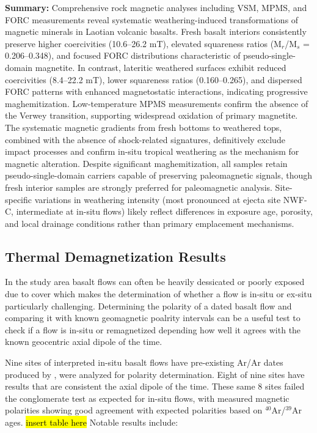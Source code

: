 \documentclass[twocolumn,11pt]{article}
\begin{document}
\textbf{Summary:} Comprehensive rock magnetic analyses including VSM, MPMS, and FORC measurements reveal systematic weathering-induced transformations of magnetic minerals in Laotian volcanic basalts. Fresh basalt interiors consistently preserve higher coercivities (10.6--26.2 mT), elevated squareness ratios (M$_r$/M$_s$ = 0.206--0.348), and focused FORC distributions characteristic of pseudo-single-domain magnetite. In contrast, lateritic weathered surfaces exhibit reduced coercivities (8.4--22.2 mT), lower squareness ratios (0.160--0.265), and dispersed FORC patterns with enhanced magnetostatic interactions, indicating progressive maghemitization. Low-temperature MPMS measurements confirm the absence of the Verwey transition, supporting widespread oxidation of primary magnetite. The systematic magnetic gradients from fresh bottoms to weathered tops, combined with the absence of shock-related signatures, definitively exclude impact processes and confirm in-situ tropical weathering as the mechanism for magnetic alteration. Despite significant maghemitization, all samples retain pseudo-single-domain carriers capable of preserving paleomagnetic signals, though fresh interior samples are strongly preferred for paleomagnetic analysis. Site-specific variations in weathering intensity (most pronounced at ejecta site NWF-C, intermediate at in-situ flows) likely reflect differences in exposure age, porosity, and local drainage conditions rather than primary emplacement mechanisms.

\subsection{Thermal Demagnetization Results}

In the study area basalt flows can often be heavily dessicated or poorly exposed due to cover which makes the determination of whether a flow is in-situ or ex-situ particularly challenging. Determining the polarity of a dated basalt flow and comparing it with known geomagnetic poalrity intervals can be a useful test to check if a flow is in-situ or remagnetized depending how well it agrees with the known geocentric axial dipole of the time.

Nine sites of interpreted in-situ basalt flows have pre-existing Ar/Ar dates produced by \citet{Sieh2019}, were analyzed for polarity determination. Eight of nine sites have results that are consistent the axial dipole of the time. These same 8 sites failed the conglomerate test as expected for in-situ flows, with measured magnetic polarities showing good agreement with expected polarities based on $^{40}$Ar/$^{39}$Ar ages. \hl{insert table here} Notable results include:
\end{document}
